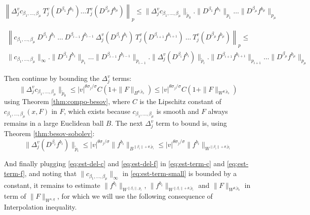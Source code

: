 \begin{equation}
\label{eq:est-term-c}
\left\| \Delta^v_j c_{\beta_1,\dots,\beta_\mu}\ T^v_j(D^{\beta_1}f^{b_1})\dots T^v_j (D^{\beta_\mu}
f^{b_\mu})  \right\|_p \leq \|\Delta^v_j c_{\beta_1,\dots,\beta_\mu}\|_{\tilde p_0}. \| D^{\beta_1} f^{b_1} \|_{p_1}\dots \|D^{\beta_\mu} f^{b_\mu}\|_{p_\mu}
\end{equation}

\begin{multline}
\label{eq:est-term-f}
\left\| c_{\beta_1,\dots,\beta_\mu}\ D^{\beta_1}f^{b_1}\ \dots \ D^{\beta_{i-1}}f^{b_{i-1}}\ \Delta^v_j
(D^{\beta_i} f^{b_i})\ T^v_j(D^{\beta_{i+1}} f^{b_{i+1}})\ \dots\ T^v_j(D^{\beta_\mu} f^{b_\mu}) \right\|_p \leq  \\ \|c_{\beta_1,\dots,\beta_\mu}\|_\infty. \| D^{\beta_1}f^{b_1} \|_{p_1}\dots \| D^{\beta_{i-1}}f^{b_{i-1}}\|_{p_{i-1}}. \|\Delta^v_j
(D^{\beta_i} f^{b_i}) \|_{\tilde p_i}. \| D^{\beta_{i+1}} f^{b_{i+1}} \|_{p_{i+1}}\dots \|D^{\beta_\mu} f^{b_\mu} \|_{p_\mu}
\end{multline}

Then continue by bounding the \(\Delta^v_j\) terms:
\begin{equation}
\label{eq:est-del-c}
\|\Delta^v_j c_{\beta_1,\dots,\beta_\mu}\|_{\tilde p_0} \leq |v|^{\theta \sigma_j/\sigma} C (1+ \|F\|_{B^{\theta,\tilde p_0}}) \leq |v|^{\theta \sigma_j/\sigma} C (1+ \|F\|_{W^{\theta,\tilde p_0}})
\end{equation}
using Theorem \ref{thm:compo-besov}, where \(C\) is the Lipschitz constant of \(c_{\beta_1,\dots,\beta_\mu}(x,F)\) in \(F\), which exists because \(c_{\beta_1,\dots,\beta_\mu}\) is smooth and \(F\) always
remains in a large Euclidean ball \(B\). The next \(\Delta^v_j\) term to bound is,
using Theorem \ref{thm:besov-sobolev}:
\begin{equation}
\label{eq:est-del-f}
\|\Delta^v_j (D^{\beta_i} f^{b_i}) \|_{\tilde p_i}\leq |v|^{\theta \sigma_j/\sigma} \|f^{b_i}\|_{B^{\|\beta_i\| +\theta, \tilde p_i}} \leq |v|^{\theta \sigma_j/\sigma} \|f^{b_i}\|_{W^{\|\beta_i\| +\theta, \tilde p_i}}
\end{equation}

And finally plugging \eqref{eq:est-del-c} and \eqref{eq:est-del-f} in \eqref{eq:est-term-c} and
\eqref{eq:est-term-f}, and noting that \(\|c_{\beta_1,\dots,\beta_\mu} \|_{\infty}\) in
\eqref{eq:est-term-small} is bounded by a constant, it remains to estimate \(\| f^{b_i}
\|_{W^{\|\beta_i\|, p_i}}\), \(\| f^{b_i}
\|_{W^{\|\beta_i\| + \theta, \tilde p_i}}\) and \(\|F\|_{W^{\theta, \tilde p_0}}\) in
term of \(\|F\|_{W^{s,q}}\), for which we will use the following consequence of Interpolation
inequality.

